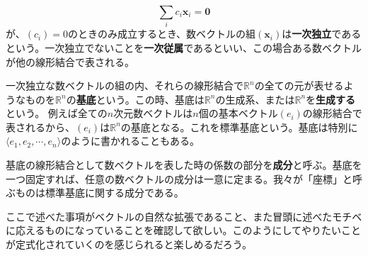 \documentclass[dvipdfmx]{jsarticle}
\begin{document}
\[\sum_ic_i\bm{x}_i=\bm{0}\]
が、$(c_i)=0$のときのみ成立するとき、数ベクトルの組$(\bm{x}_i)$は\textbf{一次独立}であるという。一次独立でないことを\textbf{一次従属}であるといい、この場合ある数ベクトルが他の線形結合で表される。\par
一次独立な数ベクトルの組の内、それらの線形結合で$\mathbb{R}^n$の全ての元が表せるようなものを$\mathbb{R}^n$の\textbf{基底}という。この時、基底は$\mathbb{R}^n$の生成系、または$\mathbb{R}^n$を\textbf{生成する}という。
例えば全ての$n$次元数ベクトルは$n$個の基本ベクトル$(e_i)$の線形結合で表されるから、$(e_i)$は$\mathbb{R}^n$の基底となる。これを標準基底という。基底は特別に$\langle e_1,e_2,\cdots,e_n \rangle$のように書かれることもある。\par
基底の線形結合として数ベクトルを表した時の係数の部分を\textbf{成分}と呼ぶ。基底を一つ固定すれば、任意の数ベクトルの成分は一意に定まる。我々が「座標」と呼ぶものは標準基底に関する成分である。\\\par
ここで述べた事項がベクトルの自然な拡張であること、また冒頭に述べたモチベに応えるものになっていることを確認して欲しい。このようにしてやりたいことが定式化されていくのを感じられると楽しめるだろう。
\end{document}
